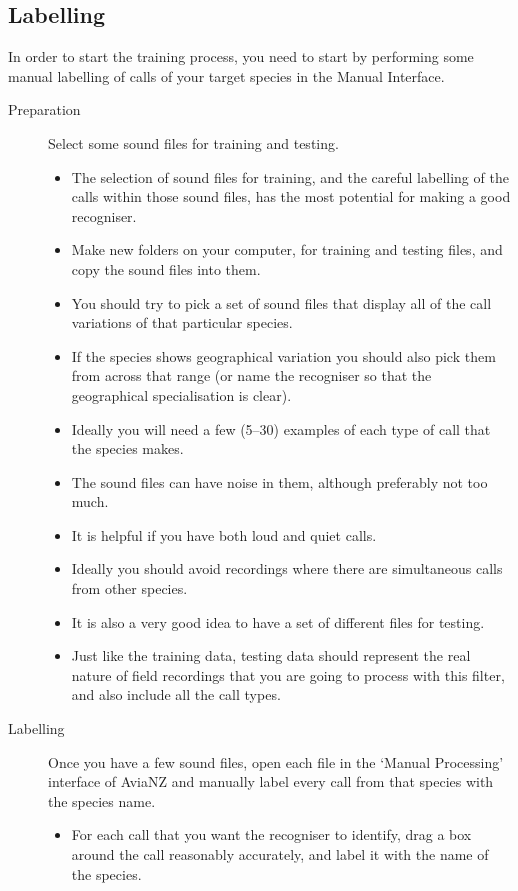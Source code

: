 \documentclass{article}
\begin{document}
\subsection{Labelling}

In order to start the training process, you need to start by performing some manual labelling of calls of your target species in the Manual Interface.

\begin{description}
\item[Preparation] Select some sound files for training and testing. 
\begin{itemize}
\item The selection of sound files for training, and the careful labelling of the calls within those sound files, has the most potential for making a good recogniser. 
\item Make new folders on your computer, for training and testing files, and copy the sound files into them.
\item You should try to pick a set of sound files that display all of the call variations of that particular species. 
\item If the species shows geographical variation you should also pick them from across that range (or name the recogniser so that the geographical specialisation is clear).  
\item Ideally you will need a few (5--30) examples of each type of call that the species makes. 
\item The sound files can have noise in them, although preferably not too much. 
\item It is helpful if you have both loud and quiet calls. 
\item Ideally you should avoid recordings where there are simultaneous calls from other species.
\item It is also a very good idea to have a set of different files for testing.
\item Just like the training data, testing data should represent the real nature of field recordings that you are going to process with this filter, and also include all the call types.
\end{itemize}
\item[Labelling] Once you have a few sound files, open each file in the `Manual Processing' interface of AviaNZ and manually label every call from that species with the species name.
\begin{itemize}
\item For each call that you want the recogniser to identify, drag a box around the call reasonably accurately, and label it with the name of the species.

\end{itemize}
\end{description}
\end{document}
